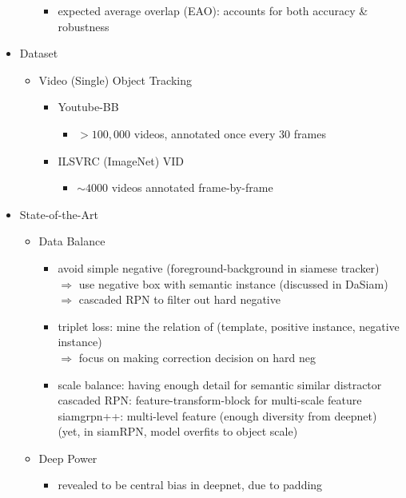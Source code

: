 \begin{itemize}
\begin{itemize}
\begin{itemize}
		\item expected average overlap (EAO): accounts for both accuracy \& robustness
		\end{itemize}
	\end{itemize}
\item Dataset
	\begin{itemize}
	\item Video (Single) Object Tracking
		\begin{itemize}
		\item Youtube-BB
			\begin{itemize}
			\item $>100,000$ videos, annotated once every $30$ frames
			\end{itemize}
		\item ILSVRC (ImageNet) VID
			\begin{itemize}
			\item $\sim4000$ videos annotated frame-by-frame
			\end{itemize}
		\end{itemize}
	\end{itemize}
\item State-of-the-Art
	\begin{itemize}
	\item Data Balance
		\begin{itemize}
		\item avoid simple negative (foreground-background in siamese tracker) \\
		$\Rightarrow$ use negative box with semantic instance (discussed in DaSiam) \\
		$\Rightarrow$ cascaded RPN to filter out hard negative
		\item triplet loss: mine the relation of (template, positive instance, negative instance) \\
		$\Rightarrow$ focus on making correction decision on hard neg
		\item scale balance: having enough detail for semantic similar distractor \\
		cascaded RPN: feature-transform-block for multi-scale feature \\
		siamgrpn++: multi-level feature (enough diversity from deepnet) \\
		(yet, in siamRPN, model overfits to object scale)
		\end{itemize}
	\item Deep Power
		\begin{itemize}
		\item revealed to be central bias in deepnet, due to padding \\

\end{itemize}
\end{itemize}
\end{itemize}
